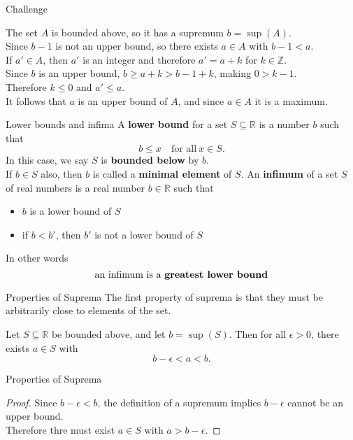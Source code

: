 \documentclass{beamer}
\begin{document}
\begin{frame}{Challenge}
\begin{soln}
The set $A$ is bounded above, so it has a supremum $b=\sup(A)$. \\
\pause
Since $b-1$ is not an upper bound, so there exists $a\in A$ with $b-1 < a$. \\
\pause
If $a'\in A$, then $a'$ is an integer and therefore $a' = a+k$ for $k\in \mathbb{Z}$. \\
\pause
Since $b$ is an upper bound, $b\geq a+k>b-1+k$, making $0 > k-1$. \\
\pause
Therefore $k\leq 0$ and $a'\leq a$. \\
\pause
It follows that $a$ is an upper bound of $A$, and since $a\in A$ it is a maximum.
\end{soln}
\end{frame}

\begin{frame}{Lower bounds and infima}
A \textbf{lower bound} for a set $S\subseteq\mathbb{R}$ is a number $b$ such that
$$b \leq x\quad\text{for all}\ x\in S.$$
\pause
In this case, we say $S$ is \textbf{bounded below} by $b$.\\
\pause
If $b\in S$ also, then $b$ is called a \textbf{minimal element} of $S$.
\pause
An \textbf{infimum} of a set $S$ of real numbers is a real number $b\in\mathbb{R}$ such that
\begin{itemize}
\item $b$ is a lower bound of $S$
\item if $b<b'$, then $b'$ is not a lower bound of $S$
\end{itemize}
\pause
In other words
$$\text{an infimum is a \bf{greatest lower bound}}$$
\end{frame}

\begin{frame}{Properties of Suprema}
The first property of suprema is that they must be arbitrarily close to elements of the set.
\begin{thm}
Let $S\subseteq\mathbb{R}$ be bounded above, and let $b = \sup(S)$.
Then for all $\epsilon > 0$, there exists $a\in S$ with
$$b-\epsilon < a < b.$$
\end{thm}
\end{frame}
\begin{frame}{Properties of Suprema}
\begin{proof}
Since $b-\epsilon < b$, the definition of a supremum implies $b-\epsilon$ cannot be an upper bound.\\
\pause
Therefore thre must exist $a\in S$ with $a > b-\epsilon$.
\end{proof}
\end{frame}
\end{document}
